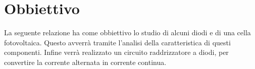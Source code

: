 \section*{Obbiettivo}

La seguente relazione ha come obbiettivo lo studio di alcuni diodi e di una cella fotovoltaica. Questo avverrà tramite l'analisi della caratteristica di questi componenti.
Infine verrà realizzato un circuito raddrizzatore a diodi, per convertire la corrente alternata in corrente continua.

